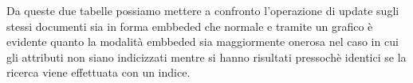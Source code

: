 Da queste due tabelle possiamo mettere a confronto l'operazione di update sugli stessi documenti sia in forma embbeded che normale e tramite un grafico 
è evidente quanto la modalità embbeded sia maggiormente onerosa nel caso in cui gli attributi non siano indicizzati mentre si hanno risultati pressochè
identici se la ricerca viene effettuata con un indice.

